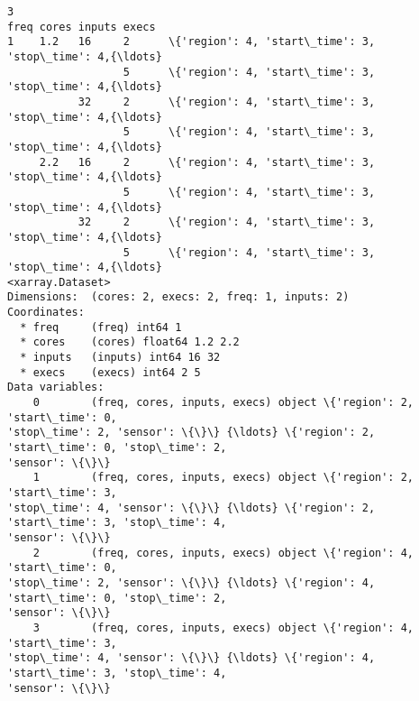 \documentclass[11pt]{article}
\begin{document}
\begin{Verbatim}[commandchars=\\\{\}]
                                                                         3
freq cores inputs execs
1    1.2   16     2      \{'region': 4, 'start\_time': 3, 'stop\_time': 4,{\ldots}
                  5      \{'region': 4, 'start\_time': 3, 'stop\_time': 4,{\ldots}
           32     2      \{'region': 4, 'start\_time': 3, 'stop\_time': 4,{\ldots}
                  5      \{'region': 4, 'start\_time': 3, 'stop\_time': 4,{\ldots}
     2.2   16     2      \{'region': 4, 'start\_time': 3, 'stop\_time': 4,{\ldots}
                  5      \{'region': 4, 'start\_time': 3, 'stop\_time': 4,{\ldots}
           32     2      \{'region': 4, 'start\_time': 3, 'stop\_time': 4,{\ldots}
                  5      \{'region': 4, 'start\_time': 3, 'stop\_time': 4,{\ldots}
<xarray.Dataset>
Dimensions:  (cores: 2, execs: 2, freq: 1, inputs: 2)
Coordinates:
  * freq     (freq) int64 1
  * cores    (cores) float64 1.2 2.2
  * inputs   (inputs) int64 16 32
  * execs    (execs) int64 2 5
Data variables:
    0        (freq, cores, inputs, execs) object \{'region': 2, 'start\_time': 0,
'stop\_time': 2, 'sensor': \{\}\} {\ldots} \{'region': 2, 'start\_time': 0, 'stop\_time': 2,
'sensor': \{\}\}
    1        (freq, cores, inputs, execs) object \{'region': 2, 'start\_time': 3,
'stop\_time': 4, 'sensor': \{\}\} {\ldots} \{'region': 2, 'start\_time': 3, 'stop\_time': 4,
'sensor': \{\}\}
    2        (freq, cores, inputs, execs) object \{'region': 4, 'start\_time': 0,
'stop\_time': 2, 'sensor': \{\}\} {\ldots} \{'region': 4, 'start\_time': 0, 'stop\_time': 2,
'sensor': \{\}\}
    3        (freq, cores, inputs, execs) object \{'region': 4, 'start\_time': 3,
'stop\_time': 4, 'sensor': \{\}\} {\ldots} \{'region': 4, 'start\_time': 3, 'stop\_time': 4,
'sensor': \{\}\}
    \end{Verbatim}
\end{document}
